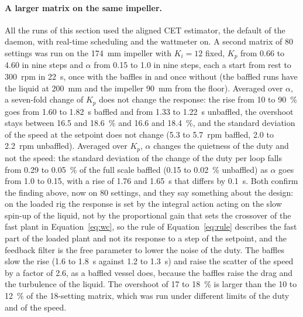 \paragraph{A larger matrix on the same impeller.}
All the runs of this section used the aligned CET estimator, the default of the daemon, with real-time scheduling and the wattmeter on. A second matrix of 80 settings was run on the 174~mm impeller with $K_i = 12$ fixed, $K_p$ from 0.66 to 4.60 in nine steps and $\alpha$ from 0.15 to 1.0 in nine steps, each a start from rest to 300~rpm in 22~s, once with the baffles in and once without (the baffled runs have the liquid at 200~mm and the impeller 90~mm from the floor). Averaged over $\alpha$, a seven-fold change of $K_p$ does not change the response: the rise from 10 to 90~\% goes from 1.60 to 1.82~s baffled and from 1.33 to 1.22~s unbaffled, the overshoot stays between 16.5 and 18.6~\% and 16.6 and 18.4~\%, and the standard deviation of the speed at the setpoint does not change (5.3 to 5.7~rpm baffled, 2.0 to 2.2~rpm unbaffled). Averaged over $K_p$, $\alpha$ changes the quietness of the duty and not the speed: the standard deviation of the change of the duty per loop falls from 0.29 to 0.05~\% of the full scale baffled (0.15 to 0.02~\% unbaffled) as $\alpha$ goes from 1.0 to 0.15, with a rise of 1.76 and 1.65~s that differs by 0.1~s. Both confirm the finding above, now on 80 settings, and they say something about the design: on the loaded rig the response is set by the integral action acting on the slow spin-up of the liquid, not by the proportional gain that sets the crossover of the fast plant in Equation~\ref{eq:wc}, so the rule of Equation~\ref{eq:rule} describes the fast part of the loaded plant and not its response to a step of the setpoint, and the feedback filter is the free parameter to lower the noise of the duty. The baffles slow the rise (1.6 to 1.8~s against 1.2 to 1.3~s) and raise the scatter of the speed by a factor of 2.6, as a baffled vessel does, because the baffles raise the drag and the turbulence of the liquid. The overshoot of 17 to 18~\% is larger than the 10 to 12~\% of the 18-setting matrix, which was run under different limits of the duty and of the speed.

